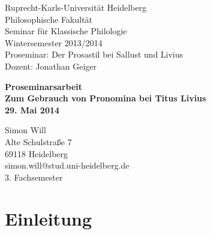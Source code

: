 \documentclass[12pt]{article}
\begin{document}
\begin{titlepage}

	\vfill {
	  \noindent Ruprecht-Karls-Universität Heidelberg \\
	  Philosophische Fakultät \\
	  Seminar für Klassische Philologie \\
	  Wintersemester 2013/2014 \\
	  Proseminar: Der Prosastil bei Sallust und Livius \\
	  Dozent: Jonathan Geiger
	}

  \begin{center}
	\vfill
	\Large{\textbf{\textsf{Proseminarsarbeit}}} \\[1cm] %
	\LARGE{\textbf{\textsf{Zum Gebrauch von Pronomina bei Titus Livius}}} \\[1cm] %
	\Large{\textbf{\textsf{29. Mai 2014}}}
  \end{center}

	\vfill{
	  \noindent Simon Will \\
	  Alte Schulstraße 7 \\
	  69118 Heidelberg \\
	  simon.will@stud.uni-heidelberg.de \\
	  3. Fachsemester \\
	}

\end{titlepage}

\tableofcontents
\thispagestyle{empty} %
\newpage 

\section{Einleitung}
\end{document}
